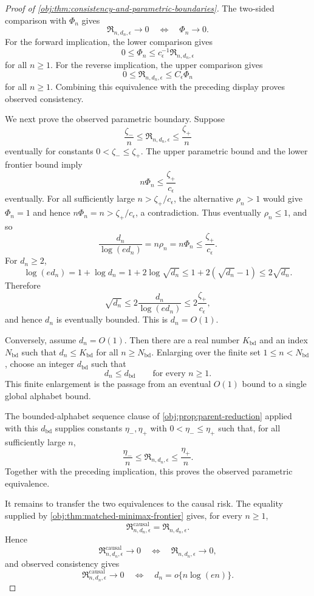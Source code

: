 \documentclass[11pt]{article}
\begin{document}
\begin{proof}[Proof of \cref{obj:thm:consistency-and-parametric-boundaries}]
The two-sided comparison with \(\Phi_n\) gives
\[
\mathfrak R_{n,d_n,\epsilon}\to0
\quad\Longleftrightarrow\quad
\Phi_n\to0 .
\]
For the forward implication, the lower comparison gives
\[
0\le\Phi_n\le c_\epsilon^{-1}\mathfrak R_{n,d_n,\epsilon}
\]
for all \(n\ge1\).  For the reverse implication, the upper comparison gives
\[
0\le\mathfrak R_{n,d_n,\epsilon}\le C_\epsilon\Phi_n
\]
for all \(n\ge1\).  Combining this equivalence with the preceding display proves observed consistency. %

We next prove the observed parametric boundary.  Suppose
\[
\frac{\zeta_-}{n}
\le
\mathfrak R_{n,d_n,\epsilon}
\le
\frac{\zeta_+}{n}
\]
eventually for constants \(0<\zeta_-\le\zeta_+\).  The upper parametric bound and the lower frontier bound imply
\[
n\Phi_n\le \frac{\zeta_+}{c_\epsilon}
\]
eventually.  For all sufficiently large \(n>\zeta_+/c_\epsilon\), the alternative \(\rho_n>1\) would give \(\Phi_n=1\) and hence \(n\Phi_n=n>\zeta_+/c_\epsilon\), a contradiction.  Thus eventually \(\rho_n\le1\), and so
\[
\frac{d_n}{\log(ed_n)}
=
n\rho_n
=
n\Phi_n
\le
\frac{\zeta_+}{c_\epsilon}.
\]
For \(d_n\ge2\),
\[
\log(ed_n)
=
1+\log d_n
=
1+2\log\sqrt{d_n}
\le
1+2(\sqrt{d_n}-1)
\le
2\sqrt{d_n}.
\]
Therefore
\[
\sqrt{d_n}
\le
2\frac{d_n}{\log(ed_n)}
\le
2\frac{\zeta_+}{c_\epsilon},
\]
and hence \(d_n\) is eventually bounded.  This is \(d_n=O(1)\). %

Conversely, assume \(d_n=O(1)\).  Then there are a real number \(K_{\mathrm{bd}}\) and an index \(N_{\mathrm{bd}}\) such that \(d_n\le K_{\mathrm{bd}}\) for all \(n\ge N_{\mathrm{bd}}\).  Enlarging over the finite set \(1\le n<N_{\mathrm{bd}}\), choose an integer \(d_{\mathrm{bd}}\) such that
\[
d_n\le d_{\mathrm{bd}}
\qquad\text{for every } n\ge1 .
\]
This finite enlargement is the passage from an eventual \(O(1)\) bound to a single global alphabet bound. %

The bounded-alphabet sequence clause of \cref{obj:prop:parent-reduction} applied with this \(d_{\mathrm{bd}}\) supplies constants \(\eta_-,\eta_+\) with \(0<\eta_-\le\eta_+\) such that, for all sufficiently large \(n\),
\[
\frac{\eta_-}{n}
\le
\mathfrak R_{n,d_n,\epsilon}
\le
\frac{\eta_+}{n}.
\]
Together with the preceding implication, this proves the observed parametric equivalence. %

It remains to transfer the two equivalences to the causal risk.  The equality supplied by \cref{obj:thm:matched-minimax-frontier} gives, for every \(n\ge1\),
\[
\mathfrak R^{\mathrm{causal}}_{n,d_n,\epsilon}
=
\mathfrak R_{n,d_n,\epsilon}.
\]
Hence
\[
\mathfrak R^{\mathrm{causal}}_{n,d_n,\epsilon}\to0
\quad\Longleftrightarrow\quad
\mathfrak R_{n,d_n,\epsilon}\to0,
\]
and observed consistency gives
\[
\mathfrak R^{\mathrm{causal}}_{n,d_n,\epsilon}\to0
\quad\Longleftrightarrow\quad
d_n=o\{n\log(en)\}.
\] %


\end{proof}
\end{document}
